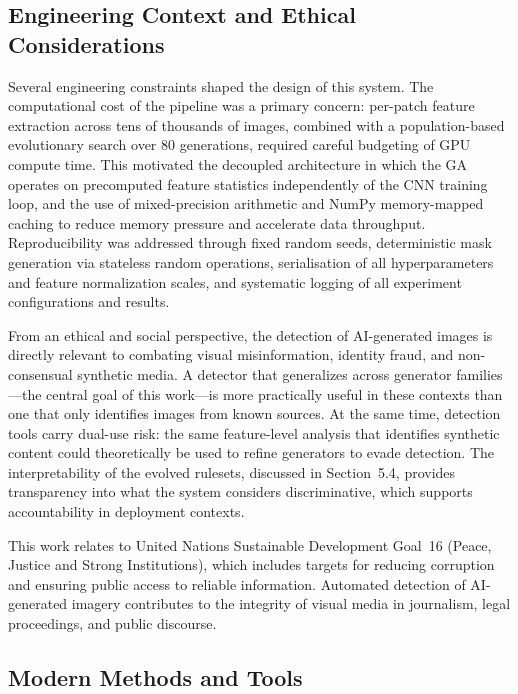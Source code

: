 \documentclass[runningheads]{llncs}
\begin{document}
\subsection{Engineering Context and Ethical Considerations}

Several engineering constraints shaped the design of this system. The computational cost of the pipeline was a primary concern: per-patch feature extraction across tens of thousands of images, combined with a population-based evolutionary search over 80 generations, required careful budgeting of GPU compute time. This motivated the decoupled architecture in which the GA operates on precomputed feature statistics independently of the CNN training loop, and the use of mixed-precision arithmetic and NumPy memory-mapped caching to reduce memory pressure and accelerate data throughput. Reproducibility was addressed through fixed random seeds, deterministic mask generation via stateless random operations, serialisation of all hyperparameters and feature normalization scales, and systematic logging of all experiment configurations and results.

From an ethical and social perspective, the detection of AI-generated images is directly relevant to combating visual misinformation, identity fraud, and non-consensual synthetic media. A detector that generalizes across generator families---the central goal of this work---is more practically useful in these contexts than one that only identifies images from known sources. At the same time, detection tools carry dual-use risk: the same feature-level analysis that identifies synthetic content could theoretically be used to refine generators to evade detection. The interpretability of the evolved rulesets, discussed in Section~5.4, provides transparency into what the system considers discriminative, which supports accountability in deployment contexts.

This work relates to United Nations Sustainable Development Goal~16 (Peace, Justice and Strong Institutions), which includes targets for reducing corruption and ensuring public access to reliable information. Automated detection of AI-generated imagery contributes to the integrity of visual media in journalism, legal proceedings, and public discourse.

\subsection{Modern Methods and Tools}
\end{document}
